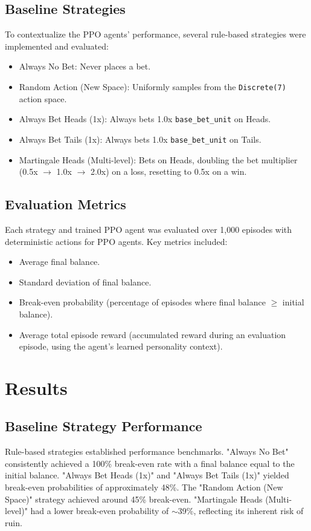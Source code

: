\documentclass{article}
\begin{document}
\subsection{Baseline Strategies}
To contextualize the PPO agents' performance, several rule-based strategies were implemented and evaluated:
\begin{itemize}
    \item Always No Bet: Never places a bet.
    \item Random Action (New Space): Uniformly samples from the \texttt{Discrete(7)} action space.
    \item Always Bet Heads (1x): Always bets 1.0x \texttt{base\_bet\_unit} on Heads.
    \item Always Bet Tails (1x): Always bets 1.0x \texttt{base\_bet\_unit} on Tails.
    \item Martingale Heads (Multi-level): Bets on Heads, doubling the bet multiplier (0.5x \(\rightarrow\) 1.0x \(\rightarrow\) 2.0x) on a loss, resetting to 0.5x on a win.
\end{itemize}

\subsection{Evaluation Metrics}
Each strategy and trained PPO agent was evaluated over 1,000 episodes with deterministic actions for PPO agents. Key metrics included:
\begin{itemize}
    \item Average final balance.
    \item Standard deviation of final balance.
    \item Break-even probability (percentage of episodes where final balance \(\ge\) initial balance).
    \item Average total episode reward (accumulated reward during an evaluation episode, using the agent's learned personality context).
\end{itemize}

\section{Results}

\subsection{Baseline Strategy Performance}
Rule-based strategies established performance benchmarks. "Always No Bet" consistently achieved a 100\% break-even rate with a final balance equal to the initial balance. "Always Bet Heads (1x)" and "Always Bet Tails (1x)" yielded break-even probabilities of approximately 48\%. The "Random Action (New Space)" strategy achieved around 45\% break-even. "Martingale Heads (Multi-level)" had a lower break-even probability of \(\sim\)39\%, reflecting its inherent risk of ruin.
\end{document}
